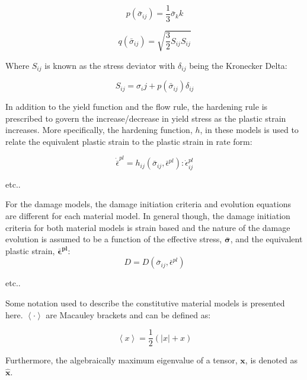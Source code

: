 \begin{equation}
p\left(\bar{\sigma}_{ij}\right)=\frac{1}{3}\bar{\sigma}_kk
\label{eqn:druc3}
\end{equation}

\begin{equation}
q\left(\bar{\sigma}_{ij}\right)=\sqrt{\frac{3}{2}S_{ij}S_{ij}}\label{eqn:druc4}
\end{equation}

Where $S_{ij}$ is known as the stress deviator with $\delta_{ij}$ being the Kronecker Delta:

\begin{equation}
S_{ij} = \sigma_ij + p\left(\bar{\sigma}_{ij}\right)\delta_{ij}
\end{equation}

In addition to the yield function and the flow rule, the hardening rule is prescribed to govern the increase/decrease in yield stress as the plastic strain increases. More specifically, the hardening function, $h$, in these models is used to relate the equivalent plastic strain to the plastic strain in rate form: 

\begin{equation}
    \dot{\bar{\epsilon}}^{pl} 
    = 
    h_{ij}
    \left(
        \bar{\sigma}_{ij}, \bar{\epsilon}^{pl}
    \right)
    : \dot{\epsilon}^{pl}_{ij}
\label{eqn:const8d}
\end{equation}

etc..

For the damage models, the damage initiation criteria and evolution equations are different for each material model. In general though, the damage initiation criteria for both material models is strain based and the nature of the damage evolution is assumed to be a function of the effective stress, $\boldsymbol{\bar{\sigma}}$, and the equivalent plastic strain, $\boldsymbol{\bar{\epsilon}^{pl}}$:
\begin{equation}
D=D\left(\bar{\sigma}_{ij},\bar{\epsilon}^{pl}\right)\label{eqn:const8}
\end{equation}



etc..

Some notation used to describe the constitutive material models is presented here. $\left\langle \cdotp\right\rangle $ are Macauley brackets and can be defined as:

\begin{equation}
\left\langle x\right\rangle =\frac{1}{2}\left(\left|x\right|+x\right)\label{eqn:const9-3}
\end{equation}

Furthermore, the algebraically maximum eigenvalue of a tensor, $\mathbf{x}$, is denoted as $\hat{\mathbf{x}}$.



